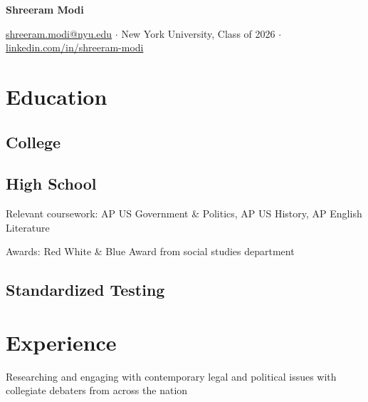 \documentclass[letterpaper]{resume-shreeram}
\begin{document}
\begin{center}
  {\Huge \bfseries Shreeram Modi}

  \href{mailto:shreeram.modi@nyu.edu}{shreeram.modi@nyu.edu}
  $\cdot$
  New York University, Class of 2026
  $\cdot$
  \href{https://linkedin.com/in/shreeram-modi}{linkedin.com/in/shreeram-modi}
\end{center}

\section{Education}

\subsection{College}


\subsection{High School}

\begin{compactitem}
  \item Relevant coursework: AP US Government \& Politics, AP US
    History, AP English Literature

  \item Awards: Red White \& Blue Award from social studies department
\end{compactitem}

\subsection{Standardized Testing}


\section{Experience}

\begin{compactitem}
  \item Researching and engaging with contemporary legal and political
    issues with collegiate debaters from across the nation
\end{compactitem}
\end{document}
